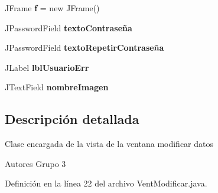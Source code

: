 \begin{DoxyCompactItemize}
\item 
\hypertarget{classcom_1_1ucab_1_1javachat_1_1_cliente_1_1view_1_1_vent_modificar_afd0a584cc889ba35215622be0bf91cd1}{J\-Frame {\bfseries f} = new J\-Frame()}\label{classcom_1_1ucab_1_1javachat_1_1_cliente_1_1view_1_1_vent_modificar_afd0a584cc889ba35215622be0bf91cd1}

\item 
\hypertarget{classcom_1_1ucab_1_1javachat_1_1_cliente_1_1view_1_1_vent_modificar_a55fc3d00a5ddc656635cddaf63a42aa2}{J\-Password\-Field {\bfseries texto\-Contraseña}}\label{classcom_1_1ucab_1_1javachat_1_1_cliente_1_1view_1_1_vent_modificar_a55fc3d00a5ddc656635cddaf63a42aa2}

\item 
\hypertarget{classcom_1_1ucab_1_1javachat_1_1_cliente_1_1view_1_1_vent_modificar_a0a22b6c11825ee03316be0f9f12783ab}{J\-Password\-Field {\bfseries texto\-Repetir\-Contraseña}}\label{classcom_1_1ucab_1_1javachat_1_1_cliente_1_1view_1_1_vent_modificar_a0a22b6c11825ee03316be0f9f12783ab}

\item 
\hypertarget{classcom_1_1ucab_1_1javachat_1_1_cliente_1_1view_1_1_vent_modificar_aab915a5c7399f2bd6ae4a02bf1c15099}{J\-Label {\bfseries lbl\-Usuario\-Err}}\label{classcom_1_1ucab_1_1javachat_1_1_cliente_1_1view_1_1_vent_modificar_aab915a5c7399f2bd6ae4a02bf1c15099}

\item 
\hypertarget{classcom_1_1ucab_1_1javachat_1_1_cliente_1_1view_1_1_vent_modificar_a01c153fadbc0fa1989d904199b8fefe0}{J\-Text\-Field {\bfseries nombre\-Imagen}}\label{classcom_1_1ucab_1_1javachat_1_1_cliente_1_1view_1_1_vent_modificar_a01c153fadbc0fa1989d904199b8fefe0}

\end{DoxyCompactItemize}


\subsection{Descripción detallada}
Clase encargada de la vista de la ventana modificar datos \begin{DoxyAuthor}{Autores}
Grupo 3 
\end{DoxyAuthor}


Definición en la línea 22 del archivo Vent\-Modificar.\-java.



